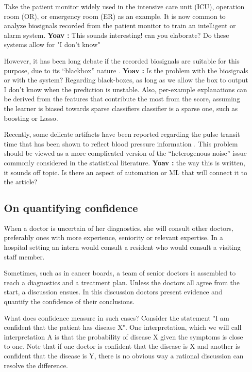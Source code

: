 \documentclass[10pt]{wlscirep}
\newcommand{\comment}[3]{{\color{#1} {\bf #2 :} #3}}
\newcommand{\yoav}[1]{\comment{red}{Yoav}{#1}}
\begin{document}
Take the patient monitor widely used in the intensive care unit (ICU), operation room (OR), or emergency room (ER) as an example. It is now common to analyze biosignals recorded from the patient monitor to train an intelligent \cite{Johnson2016} or alarm \cite{fleischman2019emergency} system.
\yoav{This sounds interesting! can you elaborate? Do these systems allow for "I don't know"}

However, it has been long debate if the recorded biosignals are suitable for this purpose, due to its ``blackbox'' nature \cite{Feldman2006,Shelley2016,Cannesson2016}. 
\yoav{Is the problem with the biosignals or with the system? Regarding black-boxes, as long as we allow the box to output I don't know when the prediction is unstable. Also, per-example explanations can be derived from the features that contribute the most from the score, assuming the learner is biased towards sparse classifiers classifier is a sparse one, such as boosting or Lasso.}

Recently, some delicate artifacts have been reported \cite{lin2019unexpected} regarding the pulse transit time that has been shown to reflect blood pressure information \cite{gesche2012continuous}. This problem should be viewed as a more complicated version of the ``heterogenous noise'' issue commonly considered in the statistical literature.
\yoav{the way this is written, it sounds off topic. Is there an aspect of automation or ML that will connect it to the article?}


\subsection*{On quantifying confidence}

When a doctor is uncertain of her diagnostics, she  will consult other doctors, preferably ones with more experience, seniority or relevant expertise. In a hospital setting an intern would consult a resident who would consult a visiting staff member.

Sometimes, such as in cancer boards, a team of senior doctors is assembled to reach a diagnostics and a treatment plan. 
Unless the doctors all agree from the start, a discussion ensues. In this discussion doctors present evidence and quantify the confidence of their conclusions.

What does confidence measure in such cases? Consider the statement "I am confident that the patient has disease X".
One interpretation, which we will call interpretation A is that the probability of disease X given the symptoms is close to one. Note that if one doctor is confident that the disease is X and another is confident that the disease is Y, there is no obvious way a rational discussion can resolve the difference.
\end{document}
